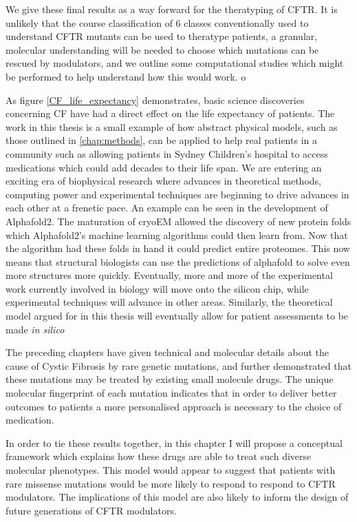 We give these final results as a way forward for the theratyping of CFTR. It is unlikely that the course classification of 6 classes conventionally used to understand CFTR mutants can be used to theratype patients, a granular, molecular understanding will be needed to choose which mutations can be rescued by modulators, and we outline some computational studies which might be performed to help understand how this would work.
o

As figure \ref{CF_life_expectancy} demonstrates, basic science discoveries concerning CF have had a direct effect on the life expectancy of patients. The work in this thesis is a small example of how abstract physical models, such as those outlined in \ref{chap:methods}, can be applied to help real patients in a community such as allowing patients in Sydney Children's hospital to access medications which could add decades to their life span. We are entering an exciting era of biophysical research where advances in theoretical methods, computing power and experimental techniques are beginning to drive advances in each other at a frenetic pace. An example can be seen in the development of Alphafold2. The maturation of cryoEM allowed the discovery of new protein folds which Alphafold2's machine learning algorithms could then learn from. Now that the algorithm had these folds in hand it could predict entire proteomes. This now means that structural biologists can use the predictions of alphafold to solve even more structures more quickly. Eventually, more and more of the experimental work currently involved in biology will move onto the silicon chip, while experimental techniques will advance in other areas. Similarly, the theoretical model argued for in this thesis will eventually allow for patient assessments to be made \textit{in silico}

The preceding chapters have given technical and molecular details about the cause of Cystic Fibrosis by rare genetic mutations, and further demonstrated that these mutations may be treated by existing small molecule drugs. The unique molecular fingerprint of each mutation indicates that in order to deliver better outcomes to patients a more personalised approach is necessary to the choice of medication. 

In order to tie these results together, in this chapter I will propose a conceptual framework which explains how these drugs are able to treat such diverse molecular phenotypes. This model would appear to suggest that patients with rare missense mutations would be more likely to respond to respond to CFTR modulators. The implications of this model are also likely to inform the design of future generations of CFTR modulators. 

